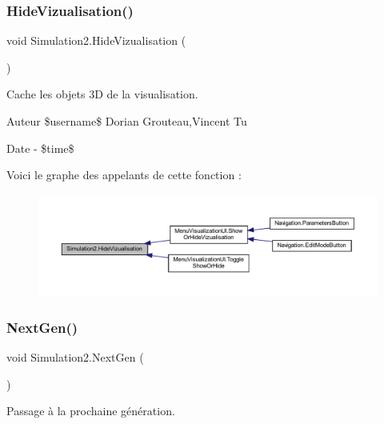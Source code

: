 \subsubsection{\texorpdfstring{Hide\+Vizualisation()}{HideVizualisation()}}
{\footnotesize\ttfamily void Simulation2.\+Hide\+Vizualisation (\begin{DoxyParamCaption}{ }\end{DoxyParamCaption})\hspace{0.3cm}{\ttfamily [inline]}}



Cache les objets 3D de la visualisation. 

\begin{DoxyAuthor}{Auteur}
\$username\$ Dorian Grouteau,Vincent Tu 
\end{DoxyAuthor}
\begin{DoxyDate}{Date}
-\/ \$time\$ 
\end{DoxyDate}
Voici le graphe des appelants de cette fonction \+:
\nopagebreak
\begin{figure}[H]
\begin{center}
\leavevmode
\includegraphics[width=350pt]{class_simulation2_ac1bb1640dae3927d80ec43c8f7707759_icgraph}
\end{center}
\end{figure}
\mbox{\label{class_simulation2_a15b6e3294aeb571c31ea98e80b0f061e}} 
\subsubsection{\texorpdfstring{Next\+Gen()}{NextGen()}}
{\footnotesize\ttfamily void Simulation2.\+Next\+Gen (\begin{DoxyParamCaption}{ }\end{DoxyParamCaption})\hspace{0.3cm}{\ttfamily [inline]}}



Passage à la prochaine génération. 

